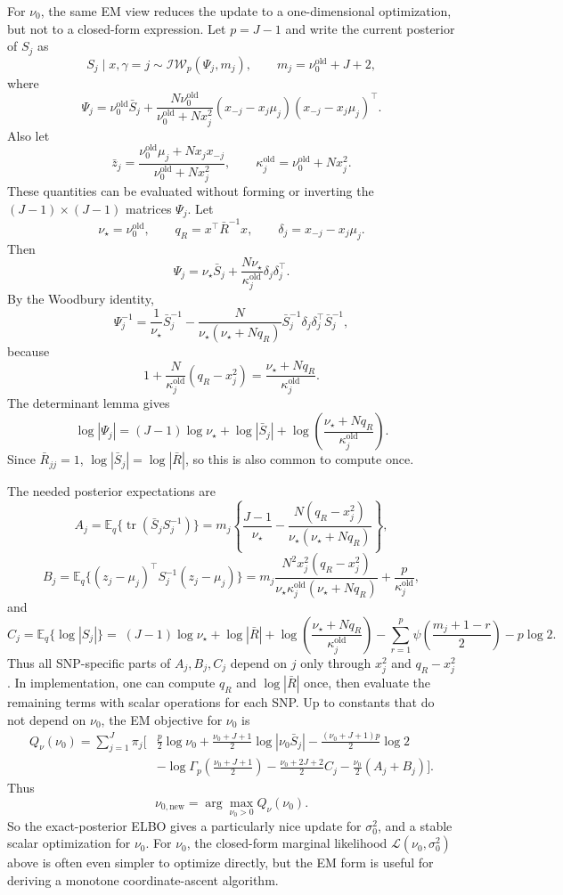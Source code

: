 \documentclass[11pt]{article}
\newcommand{\E}{\mathbb E}
\newcommand{\tr}{\operatorname{tr}}
\begin{document}
For $\nu_0$, the same EM view reduces the update to a one-dimensional
optimization, but not to a closed-form expression. Let $p=J-1$ and write the
current posterior of $S_j$ as
\[
S_j\mid x,\gamma=j
\sim
\mathcal{IW}_p(\Psi_j,m_j),
\qquad
m_j=\nu_0^{\mathrm{old}}+J+2,
\]
where
\[
\Psi_j
=
\nu_0^{\mathrm{old}}\bar S_j+
\frac{N\nu_0^{\mathrm{old}}}{\nu_0^{\mathrm{old}}+Nx_j^2}
(x_{-j}-x_j\mu_j)(x_{-j}-x_j\mu_j)^\top.
\]
Also let
\[
\bar z_j
=
\frac{\nu_0^{\mathrm{old}}\mu_j+Nx_jx_{-j}}
{\nu_0^{\mathrm{old}}+Nx_j^2},
\qquad
\kappa_j^{\mathrm{old}}=\nu_0^{\mathrm{old}}+Nx_j^2.
\]
These quantities can be evaluated without forming or inverting the
$(J-1)\times(J-1)$ matrices $\Psi_j$. Let
\[
\nu_\star=\nu_0^{\mathrm{old}},
\qquad
q_R=x^\top\bar R^{-1}x,
\qquad
\delta_j=x_{-j}-x_j\mu_j.
\]
Then
\[
\Psi_j
=
\nu_\star\bar S_j+
\frac{N\nu_\star}{\kappa_j^{\mathrm{old}}}\delta_j\delta_j^\top.
\]
By the Woodbury identity,
\[
\Psi_j^{-1}
=
\frac{1}{\nu_\star}\bar S_j^{-1}
-
\frac{N}{\nu_\star(\nu_\star+Nq_R)}
\bar S_j^{-1}\delta_j\delta_j^\top\bar S_j^{-1},
\]
because
\[
1+\frac{N}{\kappa_j^{\mathrm{old}}}(q_R-x_j^2)
=
\frac{\nu_\star+Nq_R}{\kappa_j^{\mathrm{old}}}.
\]
The determinant lemma gives
\[
\log|\Psi_j|
=
(J-1)\log\nu_\star+\log|\bar S_j|
+\log\left(\frac{\nu_\star+Nq_R}{\kappa_j^{\mathrm{old}}}\right).
\]
Since $\bar R_{jj}=1$, $\log|\bar S_j|=\log|\bar R|$, so this is also common
to compute once.

The needed posterior expectations are
\[
A_j=\E_q\{\tr(\bar S_jS_j^{-1})\}
=
m_j
\left\{
\frac{J-1}{\nu_\star}
-
\frac{N(q_R-x_j^2)}{\nu_\star(\nu_\star+Nq_R)}
\right\},
\]
\[
B_j=\E_q\{(z_j-\mu_j)^\top S_j^{-1}(z_j-\mu_j)\}
=
m_j
\frac{N^2x_j^2(q_R-x_j^2)}
{\nu_\star\kappa_j^{\mathrm{old}}(\nu_\star+Nq_R)}
+\frac{p}{\kappa_j^{\mathrm{old}}},
\]
and
\[
C_j=\E_q\{\log|S_j|\}
=
\;(J-1)\log\nu_\star+\log|\bar R|
+\log\left(\frac{\nu_\star+Nq_R}{\kappa_j^{\mathrm{old}}}\right)
-\sum_{r=1}^p \psi\left(\frac{m_j+1-r}{2}\right)
-p\log 2.
\]
Thus all SNP-specific parts of $A_j,B_j,C_j$ depend on $j$ only through
$x_j^2$ and $q_R-x_j^2$. In implementation, one can compute $q_R$ and
$\log|\bar R|$ once, then evaluate the remaining terms with scalar operations
for each SNP.
Up to constants that do not depend on $\nu_0$, the EM objective for $\nu_0$ is
\begin{align*}
Q_\nu(\nu_0)
=
\sum_{j=1}^J \pi_j
\Bigg[
&\frac{p}{2}\log\nu_0
+\frac{\nu_0+J+1}{2}\log|\nu_0\bar S_j|
-\frac{(\nu_0+J+1)p}{2}\log 2 \\
&-\log\Gamma_p\left(\frac{\nu_0+J+1}{2}\right)
-\frac{\nu_0+2J+2}{2}C_j
-\frac{\nu_0}{2}(A_j+B_j)
\Bigg].
\end{align*}
Thus
\[
\boxed{
\nu_{0,\mathrm{new}}=\arg\max_{\nu_0>0} Q_\nu(\nu_0).
}
\]
So the exact-posterior ELBO gives a particularly nice update for
$\sigma_0^2$, and a stable scalar optimization for $\nu_0$. For $\nu_0$, the
closed-form marginal likelihood $\mathcal L(\nu_0,\sigma_0^2)$ above is often
even simpler to optimize directly, but the EM form is useful for deriving a
monotone coordinate-ascent algorithm.
\end{document}
